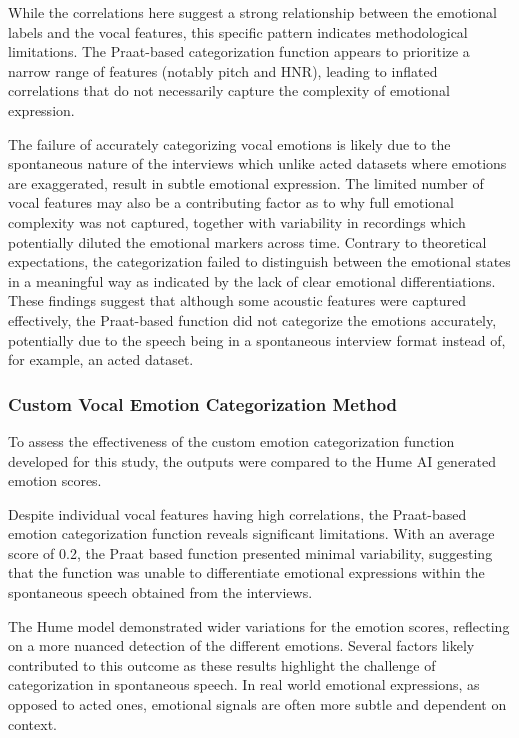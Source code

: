 While the correlations here suggest a strong relationship between the emotional labels and the vocal features, this specific pattern indicates methodological limitations. The Praat-based categorization function appears to prioritize a narrow range of features (notably pitch and HNR), leading to inflated correlations that do not necessarily capture the complexity of emotional expression.

The failure of accurately categorizing vocal emotions is likely due to the spontaneous nature of the interviews which unlike acted datasets where emotions are exaggerated, result in subtle emotional expression. The limited number of vocal features may also be a contributing factor as to why full emotional complexity was not captured, together with variability in recordings which potentially diluted the emotional markers across time.
Contrary to theoretical expectations, the categorization failed to distinguish between the emotional states in a meaningful way as indicated by the lack of clear emotional differentiations. These findings suggest that although some acoustic features were captured effectively, the Praat-based function did not categorize the emotions accurately, potentially due to the speech being in a spontaneous interview format instead of, for example, an acted dataset. 

\subsubsection{Custom Vocal Emotion Categorization Method}
To assess the effectiveness of the custom emotion categorization function developed for this study, the outputs were compared to the Hume AI generated emotion scores.

Despite individual vocal features having high correlations, the Praat-based emotion categorization function reveals significant limitations. With an average score of 0.2, the Praat based function presented minimal variability, suggesting that the function was unable to differentiate emotional expressions within the spontaneous speech obtained from the interviews.

The Hume model demonstrated wider variations for the emotion scores, reflecting on a more nuanced detection of the different emotions. 
Several factors likely contributed to this outcome as these results highlight the challenge of categorization in spontaneous speech. In real world emotional expressions, as opposed to acted ones, emotional signals are often more subtle and dependent on context. 

